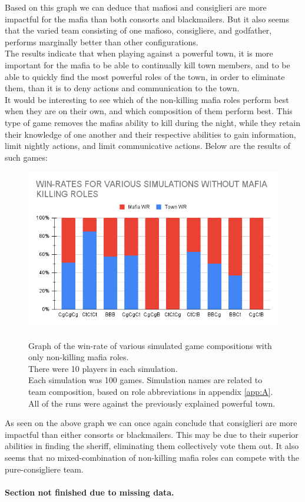 \vspace{-5px}Based on this graph we can deduce that mafiosi and
consiglieri are more
impactful for the mafia than both consorts and blackmailers. But it also seems
that the varied team consisting of one mafioso, consigliere, and godfather,
performs marginally better than other configurations. \\
The results indicate that when playing against a powerful town, it is more
important for the mafia to be able to continually kill town members, and to be
able to quickly find the most powerful roles of the town, in order to eliminate
them, than it is to deny actions and communication to the town. \\
It would be interesting to see which of the non-killing mafia roles perform
best when they are on their own, and which composition of them perform best.
This type of game removes the mafias ability to kill during the night, while
they retain their knowledge of one another and their respective abilities to
gain information, limit nightly actions, and limit communicative actions. Below
are the results of such games:
\begin{figure}[H]
    \includegraphics[width=1\linewidth]{figures/Winrates_NonKilling}
    \caption{\\Graph of the win-rate of various simulated game compositions
        with only non-killing mafia roles.\\
        There were 10 players in each simulation.\\
        Each simulation was 100 games.
        Simulation names are related to team composition, based on role
        abbreviations in appendix \ref{app:A}.\\
        All of the runs were against the previously explained powerful town.}
    \label{fig:VariousSimulationsNonKilling}
\end{figure}
\vspace{-5px} As seen on the above graph we can once again conclude that
consiglieri are more impactful than either consorts or blackmailers. This may
be due to their superior abilities in finding the sheriff, eliminating them
collectively vote them out. It also seems that no mixed-combination of
non-killing mafia roles can compete with the pure-consigliere team. \\\\
\textbf{Section not finished due to missing data.}
